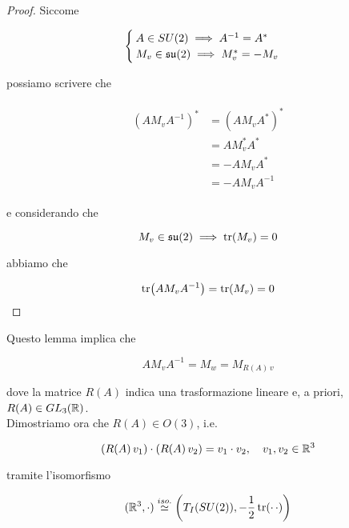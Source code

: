 \begin{proof}
	Siccome
	
	\begin{equation}
		\begin{cases}
			A \in SU(2) \implies A^{-1} = A^{*}\\
			M_{v} \in \mathfrak{su}(2) \implies M_{v}^{*} = - M_{v}
		\end{cases}
	\end{equation}

	possiamo scrivere che
	
	\begin{align}
		\begin{split}
			(A M_{v} A^{-1})^{*} &= (A M_{v} A^{*})^{*}\\
			&= A M_{v}^{*} A^{*}\\
			&= - A M_{v} A^{*}\\
			&= - A M_{v} A^{-1}
		\end{split}
	\end{align}

	e considerando che
	
	\begin{equation}
		M_{v} \in \mathfrak{su}(2) \implies \tr(M_{v}) = 0
	\end{equation}
	
	abbiamo che
	
	\begin{equation}
		\tr(A M_{v} A^{-1}) = \tr(M_{v}) = 0
	\end{equation}
\end{proof}

Questo lemma implica che

\begin{equation}
	A M_{v} A^{-1} = M_{w} = M_{R(A) \, v}
\end{equation}

dove la matrice $ R(A) $ indica una trasformazione lineare e, a priori, $ R(A) \in GL_{3}(\mathbb{R}) $.\\
Dimostriamo ora che $ R(A) \in O(3) $, i.e.

\begin{equation}
	(R(A) \, v_{1}) \cdot (R(A) \, v_{2}) = v_{1} \cdot v_{2} \qcomma v_{1},v_{2} \in \R^{3}
\end{equation}

tramite l'isomorfismo

\begin{equation}
	(\mathbb{R}^{3},\cdot) \stackrel{iso.}{\simeq} \left( T_{I}(SU(2)), -\dfrac{1}{2} \tr(\cdot \, \cdot) \right)
\end{equation}

